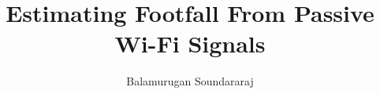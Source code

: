 


\title{Estimating Footfall From Passive Wi-Fi Signals}
\newcommand{\subtitle}{Case Study with Smart Street Sensor Project}
\author{Balamurugan Soundararaj}
\newcommand{\degree}{Doctor of Philosophy}
\raggedbottom
\onehalfspacing


\frontmatter

\cleardoublepage

\mainmatter

\cleardoublepage

\cleardoublepage

\cleardoublepage

\cleardoublepage

\cleardoublepage

\cleardoublepage



\backmatter





